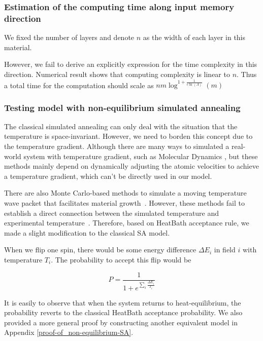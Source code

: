 \documentclass[twocolumn,superscriptaddress,english,showpacs,longbibliography]{revtex4-2}
\begin{document}
\subsubsection{Estimation of the computing time along input memory direction}\label{Estimation-of-the-computing-time-along-input-memory-direction}

We fixed the number of layers and denote $n$ as the width of each layer in this material.

However, we fail to derive an explicitly expression for the time complexity in this direction. 
Numerical result shows that computing complexity is linear to $n$. Thus a total time
for the computation should scale as $nm\log^{1 + \frac{1}{c\ln(\Lambda)}}(m)$ 

\subsubsection{Testing model with non-equilibrium simulated
annealing}\label{some-details-about-non-equilibrium-simulated-annealing}

The classical simulated annealing can only deal with the situation that
the temperature is space-invariant. However, we need to borden this concept
due to the temperature gradient. Although there are many ways to
simulated a real-world system with temperature gradient, such as
Molecular Dynamics \cite{Bai2015, Deng2006}, but
these methods mainly depend on dynamically adjusting the atomic
velocities to achieve a temperature gradient, which can't be directly
used in our model.

There are also Monte Carlo-based methods to simulate a moving
temperature wave packet that facilitates material growth~\cite{Godfrey1995, Tan2017}.
However, these methods fail to establish a direct connection between the simulated temperature and experimental
temperature~\cite{Zollner2014}.
Therefore, based on HeatBath acceptance rule, we made a slight modification to the classical SA model.

When we flip one spin, there would be some energy difference
$\Delta E_{i}$ in field $i$ with temperature $T_i$. The
probability to accept this flip would be

\begin{equation}
    \label{eq:non-equilibrium-SA}
P = \frac{1}{1 + e^{\sum_i \frac{\Delta E_i}{T_i}}}
\end{equation}

It is easily to observe that when the system returns to
heat-equilibrium, the probability reverts to the classical HeatBath
acceptance probability. We also provided a more general proof by constructing another equivalent model in Appendix \ref{proof-of_non-equilibrium-SA}.
\end{document}
